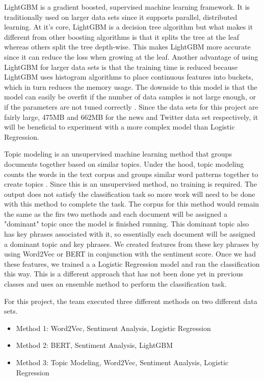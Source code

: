 \documentclass[conference]{IEEEtran}
\begin{document}
LightGBM is a gradient boosted, supervised machine learning framework. It is traditionally used on larger data sets since it supports parallel, distributed learning. At it's core, LightGBM is a decision tree algorithm but what makes it different from other boosting algorithms is that it splits the tree at the leaf whereas others split the tree depth-wise. This makes LightGBM more accurate since it can reduce the loss when growing at the leaf. Another advantage of using LightGBM for larger data sets is that the training time is reduced because LightGBM uses histogram algorithms to place continuous features into buckets, which in turn reduces the memory usage. The downside to this model is that the model can easily be overfit if the number of data samples is not large enough, or if the parameters are not tuned correctly \cite{b12}. Since the data sets for this project are fairly large, 475MB and 662MB for the news and Twitter data set respectively, it will be beneficial to experiment with a more complex model than Logistic Regression.

Topic modeling is an unsupervised machine learning method that groups documents together based on similar topics. Under the hood, topic modeling counts the words in the text corpus and groups similar word patterns together to create topics \cite{b5}. Since this is an unsupervised method, no training is required. The output does not satisfy the classification task so more work will need to be done with this method to complete the task. The corpus for this method would remain the same as the firs two methods and each document will be assigned a "dominant" topic once the model is finished running. This dominant topic also has key phrases associated with it, so essentially each document will be assigned a dominant topic and key phrases. We created features from these key phrases by using Word2Vec or BERT in conjunction with the sentiment score. Once we had these features, we trained a a Logistic Regression model and ran the classification this way. This is a different approach that has not been done yet in previous classes and uses an ensemble method to perform the classification task.

For this project, the team executed three different methods on two different data sets.
\begin{itemize}
    \item Method 1: Word2Vec, Sentiment Analysis, Logistic Regression
    \item Method 2: BERT, Sentiment Analysis, LightGBM
    \item Method 3: Topic Modeling, Word2Vec, Sentiment Analysis, Logistic Regression
\end{itemize}
\end{document}

